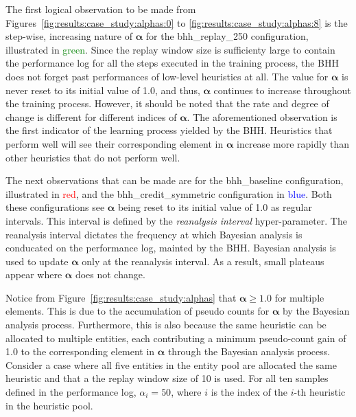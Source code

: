 The first logical observation to be made from Figures~\ref{fig:results:case_study:alphas:0} to \ref{fig:results:case_study:alphas:8} is the step-wise, increasing nature of $\boldsymbol{\alpha}$ for the bhh\_replay\_250 configuration, illustrated in \textcolor{green}{green}. Since the replay window size is sufficienty large to contain the performance log for all the steps executed in the training process, the \acs{BHH} does not forget past performances of low-level heuristics at all. The value for $\boldsymbol{\alpha}$ is never reset to its initial value of 1.0, and thus, $\boldsymbol{\alpha}$ continues to increase throughout the training process. However, it should be noted that the rate and degree of change is different for different indices of $\boldsymbol{\alpha}$. The aforementioned observation is the first indicator of the learning process yielded by the \acs{BHH}. Heuristics that perform well will see their corresponding element in $\boldsymbol{\alpha}$ increase more rapidly than other heuristics that do not perform well.

The next observations that can be made are for the bhh\_baseline configuration, illustrated in \textcolor{red}{red}, and the bhh\_credit\_symmetric configuration in \textcolor{blue}{blue}. Both these configurations see $\boldsymbol{\alpha}$ being reset to its initial value of 1.0 as regular intervals. This interval is defined by the \textit{reanalysis interval} hyper-parameter. The reanalysis interval dictates the frequency at which Bayesian analysis is conducated on the performance log, mainted by the \acs{BHH}. Bayesian analysis is used to update $\boldsymbol{\alpha}$ only at the reanalysis interval. As a result, small plateaus appear where $\boldsymbol{\alpha}$ does not change.

Notice from Figure~\ref{fig:results:case_study:alphas} that $\boldsymbol{\alpha} \geq 1.0$ for multiple elements. This is due to the accumulation of pseudo counts for $\boldsymbol{\alpha}$ by the Bayesian analysis process. Furthermore, this is also because the same heuristic can be allocated to multiple entities, each contributing a minimum pseudo-count gain of 1.0 to the corresponding element in $\boldsymbol{\alpha}$ through the Bayesian analysis process. Consider a case where all five entities in the entity pool are allocated the same heuristic and that a the replay window size of 10 is used. For all ten samples defined in the performance log, $\alpha_{i} = 50$, where $i$ is the index of the $i$-th heuristic in the heuristic pool.

